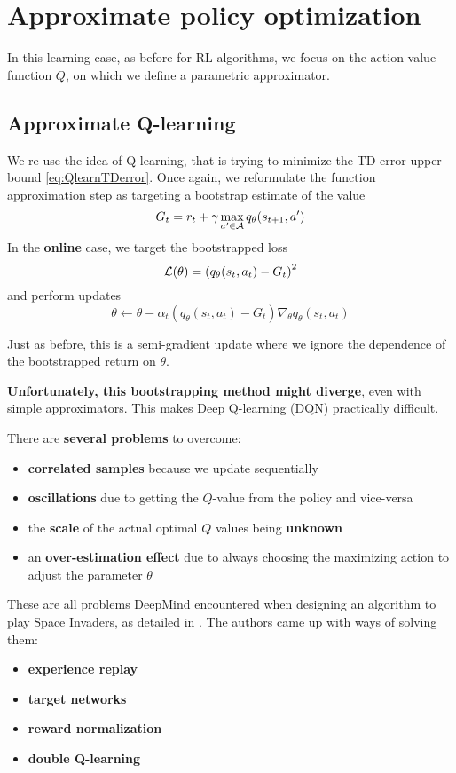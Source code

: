 \documentclass[../course-notes.tex]{subfiles}
\begin{document}
\section{Approximate policy optimization}

In this learning case, as before for RL algorithms, we focus on the action value function $Q$, on which we define a parametric approximator.


\subsection{Approximate Q-learning}

We re-use the idea of Q-learning, that is trying to minimize the TD error upper bound \eqref{eq:QlearnTDerror}. Once again, we reformulate the function approximation step as targeting a bootstrap estimate of the value
\[
	G_t = r_t + \gamma \max_{a'\in\mathcal{A}} q_\theta (s_{t+1}, a')
\]
In the \textbf{online} case, we target the bootstrapped loss
\[
	\mathcal{L}(\theta) = {(q_\theta(s_t,a_t) - G_t)}^2
\]
and perform updates
\begin{equation}
	\theta \leftarrow \theta - \alpha_t (q_\theta(s_t, a_t) - G_t)\nabla_\theta q_\theta(s_t, a_t)
\end{equation}

Just as before, this is a semi-gradient update where we ignore the dependence of the bootstrapped return on $\theta$.

\textbf{\redfont Unfortunately, this bootstrapping method might diverge}, even with simple approximators.
This makes Deep Q-learning (DQN) practically difficult.

There are \textbf{\redfont several problems} to overcome:
\begin{itemize}
	\item \textbf{correlated samples} because we update sequentially
	\item \textbf{oscillations} due to getting the $Q$-value from the policy and vice-versa
	\item the \textbf{scale} of the actual optimal $Q$ values being \textbf{unknown}
	\item an \textbf{over-estimation effect} due to always choosing the maximizing action to adjust the parameter $\theta$
\end{itemize}

These are all problems DeepMind encountered when designing an algorithm to play Space Invaders, as detailed in . The authors came up with ways of solving them:
\begin{itemize}\bluefont
	\item \textbf{experience replay}
	\item \textbf{target networks}
	\item \textbf{reward normalization}
	\item \textbf{double Q-learning}
\end{itemize}
\end{document}
